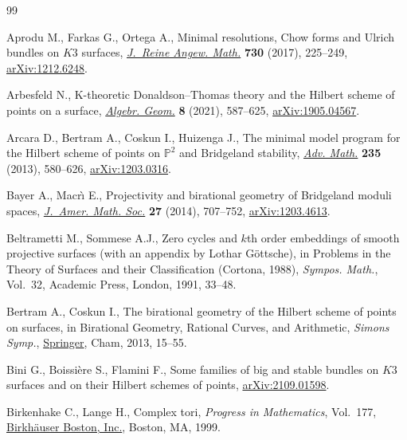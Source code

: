 \documentclass[10pt,a4paper]{amsart}
\numberwithin{equation}{section}
\begin{document}
\begin{thebibliography}{99}
\footnotesize\itemsep=0pt


Aprodu M., Farkas G., Ortega A., Minimal resolutions, {C}how forms and {U}lrich
 bundles on {$K3$} surfaces, \href{https://doi.org/10.1515/crelle-2014-0124}{\textit{J.~Reine Angew. Math.}} \textbf{730}
 (2017), 225--249, \href{https://arxiv.org/abs/1212.6248}{arXiv:1212.6248}.

Arbesfeld N., K-theoretic {D}onaldson--{T}homas theory and the {H}ilbert scheme
 of points on a surface, \href{https://doi.org/10.14231/ag-2021-018}{\textit{Algebr. Geom.}} \textbf{8} (2021), 587--625,
 \href{https://arxiv.org/abs/1905.04567}{arXiv:1905.04567}.

Arcara D., Bertram A., Coskun I., Huizenga J., The minimal model program for
 the {H}ilbert scheme of points on {$\mathbb{P}^2$} and {B}ridgeland
 stability, \href{https://doi.org/10.1016/j.aim.2012.11.018}{\textit{Adv. Math.}} \textbf{235} (2013), 580--626,
 \href{https://arxiv.org/abs/1203.0316}{arXiv:1203.0316}.

Bayer A., Macr\`{\i} E., Projectivity and birational geometry of {B}ridgeland
 moduli spaces, \href{https://doi.org/10.1090/S0894-0347-2014-00790-6}{\textit{J.~Amer. Math. Soc.}} \textbf{27} (2014), 707--752,
 \href{https://arxiv.org/abs/1203.4613}{arXiv:1203.4613}.

Beltrametti M., Sommese A.J., Zero cycles and {$k$}th order embeddings of
 smooth projective surfaces (with an appendix by Lothar G\"ottsche), in
 Problems in the Theory of Surfaces and their Classification ({C}ortona,
 1988), \textit{Sympos. Math.}, Vol.~32, Academic Press, London, 1991, 33--48.

Bertram A., Coskun I., The birational geometry of the {H}ilbert scheme of
 points on surfaces, in Birational Geometry, Rational Curves, and Arithmetic,
 \textit{Simons Symp.}, \href{https://doi.org/10.1007/978-1-4614-6482-2_2}{Springer}, Cham, 2013, 15--55.

Bini G., Boissi\`ere S., Flamini F., Some families of big and stable bundles on
 $K3$ surfaces and on their Hilbert schemes of points, \href{https://arxiv.org/abs/2109.01598}{arXiv:2109.01598}.

Birkenhake C., Lange H., Complex tori, \textit{Progress in Mathematics}, Vol.~177, \href{https://doi.org/10.1007/978-1-4612-1566-0}{Birkh\"auser Boston, Inc.}, Boston, MA, 1999.


\end{thebibliography}
\end{document}
